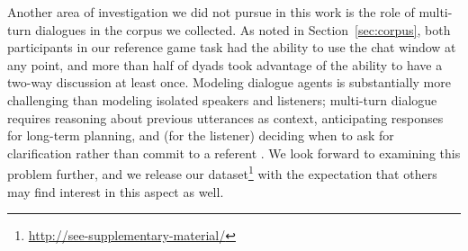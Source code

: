 \documentclass[11pt,letterpaper]{article}
\renewcommand{\|}{\mid}
\newcommand{\secref}[1]{Section~\ref{#1}}
\begin{document}
Another area of investigation we did not pursue in this work is the role of
multi-turn dialogues in the corpus we collected. As noted in \secref{sec:corpus},
both participants in our reference game task had the ability to use the chat window
at any point, and more than half of dyads took advantage of the ability
to have a two-way discussion at least once. Modeling dialogue agents is substantially
more challenging than modeling isolated speakers and listeners; multi-turn dialogue
requires reasoning about previous utterances as context, anticipating
responses for long-term planning, and (for the listener) deciding when
to ask for clarification rather than commit to a referent
\cite{Lewis79_Scorekeeping,BrownYule83_Discourse,Clark96,Roberts96_InformationStructureDiscourse}.
We look forward to examining this problem further, and we release our
dataset\footnote{\label{foot:release}\url{http://see-supplementary-material/}}
with the expectation that others may find interest in this aspect as well.
\end{document}
